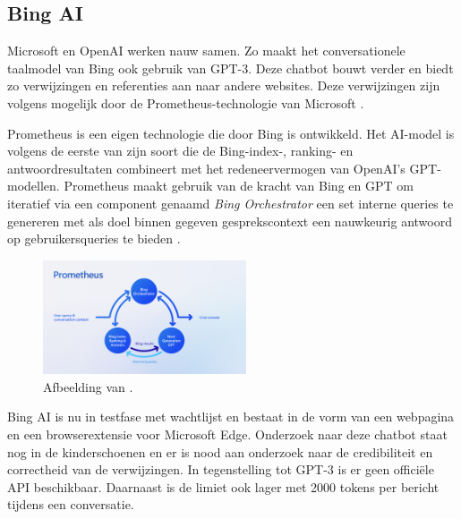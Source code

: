 
\subsection{Bing AI}


Microsoft en OpenAI werken nauw samen. Zo maakt het conversationele taalmodel van Bing ook gebruik van GPT-3. Deze chatbot bouwt verder en biedt zo verwijzingen en referenties aan naar andere websites. Deze verwijzingen zijn volgens mogelijk door de Prometheus-technologie van Microsoft \autocite{Ribas2023}.

Prometheus is een eigen technologie die door Bing is ontwikkeld. Het AI-model is volgens \textcite{Ribas2023} de eerste van zijn soort die de Bing-index-, ranking- en antwoordresultaten combineert met het redeneervermogen van OpenAI’s GPT-modellen. Prometheus maakt gebruik van de kracht van Bing en GPT om iteratief via een component genaamd \textit{Bing Orchestrator} een set interne queries te genereren met als doel binnen gegeven gesprekscontext een nauwkeurig antwoord op gebruikersqueries te bieden \autocite{Ribas2023}.

\begin{figure}[H]
	\includegraphics[width=6cm]{img/bing-ai-prometheus.png}
	\caption{Afbeelding van \textcite{Ribas2023}.}
\end{figure}

Bing AI is nu in testfase met wachtlijst en bestaat in de vorm van een webpagina en een browserextensie voor Microsoft Edge. Onderzoek naar deze chatbot staat nog in de kinderschoenen en er is nood aan onderzoek naar de credibiliteit en correctheid van de verwijzingen. In tegenstelling tot GPT-3 is er geen officiële API beschikbaar. Daarnaast is de limiet ook lager met 2000 tokens per bericht tijdens een conversatie.

